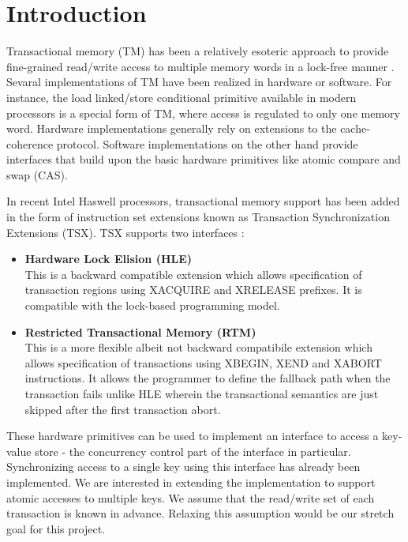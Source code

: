 \section{Introduction} \label{sec:intro}

Transactional memory (TM) has been a relatively esoteric approach to provide
fine-grained read/write access to multiple memory words in a lock-free manner
\citep{Herlihy93}. Sevaral implementations of TM have been realized in hardware
or software. For instance, the load linked/store conditional primitive available
in modern processors is a special form of TM, where access is regulated to only
one memory word. Hardware implementations generally rely on extensions to the
cache-coherence protocol. Software implementations on the other hand provide
interfaces that build upon the basic hardware primitives like atomic compare and
swap (CAS).

In recent Intel Haswell processors, transactional memory support has been added
in the form of instruction set extensions known as Transaction Synchronization
Extensions (TSX).  TSX supports two interfaces \citep{tsx-intro} : \\


\begin{itemize} 
\item \textbf{Hardware Lock Elision (HLE)} \\ This is a backward
compatible extension which allows specification of transaction regions using
XACQUIRE and XRELEASE prefixes. It is compatible with the lock-based programming
model. \\ 

\item \textbf{Restricted Transactional Memory (RTM)} \\ This is a more
flexible albeit not backward compatibile extension which allows specification of
transactions using XBEGIN, XEND and XABORT instructions. It allows the
programmer to define the fallback path when the transaction fails unlike HLE
wherein the transactional semantics are just skipped after the first transaction
abort. \\ 
\end{itemize}

These hardware primitives can be used to implement an interface to access a
key-value store - the concurrency control part of the interface in particular.
Synchronizing access to a single key using this interface has already been
implemented. We are interested in extending the implementation to support atomic
accesses to multiple keys. We assume that the read/write set of each transaction
is known in advance. Relaxing this assumption would be our stretch goal for this
project.

